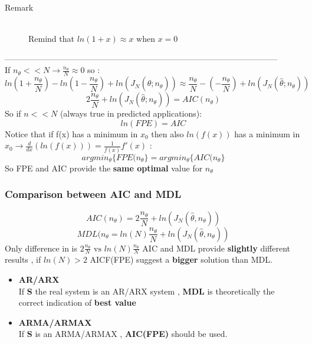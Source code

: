 \begin{description}
\item[Remark]\hfill\\
Remind that $ln(1+x) \approx x \text{ when } x=0$
\end{description}
---------------------------------------------------------------------------------------------------
\\If $n_{\theta}<<N \to \frac{n_{\theta}}{N} \approx 0$ so :
$$ ln(1+\frac{n_{\theta}}{N}) - ln(1-\frac{n_{\theta}}{N}) + ln(J_N(\hat{\theta};n_{\theta})) \approx \frac{n_{\theta}}{N}-(-\frac{n_{\theta}}{N})+ln(J_N(\hat{\theta};n_{\theta}))$$
$$ 2\frac{n_{\theta}}{N}+ln(J_N(\hat{\theta};n_{\theta})) = AIC(n_{\theta})$$
So if $n<<N$ (always true in predicted applications):
\[
\boxed{ln(FPE) = AIC	}
\]
Notice that if f(x) has a minimum in $x_0$ then also $ln(f(x))$ has a minimum in $x_0 \to \frac{d}{dx}(ln(f(x))) = \frac{1}{f(x)}f'(x)$ :
\[
\boxed{argmin_{\theta}\{FPE(n_{\theta}\}=argmin_{\theta}\{AIC(n_{\theta}\}}
\] 
So FPE and AIC provide the \textbf{same optimal} value for $n_{\theta}$

\subsubsection{Comparison between AIC and MDL}
$$ AIC(n_\theta) = 2 \frac{n_{\theta}}{N}+ ln(J_N(\hat{\theta},n_{\theta})) $$
$$ MDL(n_{\theta}=ln(N)\frac{n_{\theta}}{N}+ln(J_N(\hat{\theta},n_{\theta}))$$
Only difference in is $2 \frac{n_{\theta}}{N} \text{ vs } ln(N)\frac{n_{\theta}}{N} $
AIC and MDL provide \textbf{slightly } different results , if $ln(N) > 2$ AICF(FPE) suggest a \textbf{bigger} solution than MDL.\\
\begin{itemize}
\item \textbf{AR/ARX}\\
If \textbf{S} the real system is an AR/ARX system , \textbf{MDL} is theoretically the correct indication of \textbf{best value}
\item \textbf{ARMA/ARMAX}\\
If \textbf{S} is an ARMA/ARMAX , \textbf{AIC(FPE)} should be used.
\end{itemize}
\newpage
